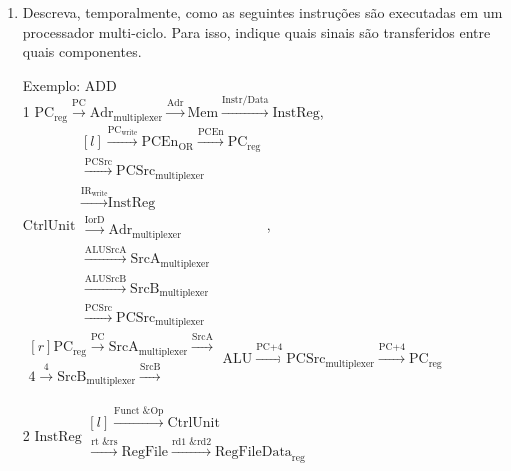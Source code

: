 \documentclass{article}
\begin{document}
\begin{enumerate}
\item Descreva, temporalmente, como as seguintes instruções são executadas em um processador multi-ciclo. Para isso, indique quais sinais são transferidos entre quais componentes.

Exemplo: ADD\\

1 $\text{PC}_\text{reg} \xrightarrow{\text{PC}} \text{Adr}_\text{multiplexer} \xrightarrow{\text{Adr}} \text{Mem} \xrightarrow{\text{Instr/Data}} \text{InstReg}$, $\text{CtrlUnit} \begin{matrix*}[l] 
\xrightarrow{\text{PC}_\text{write}} \text{PCEn}_\text{OR} \xrightarrow{\text{PCEn}} \text{PC}_\text{reg} \\ 
\xrightarrow{\text{PCSrc}} \text{PCSrc}_\text{multiplexer} \\
\xrightarrow{\text{IR}_\text{write}} \text{InstReg} \\
\xrightarrow{\text{IorD}} \text{Adr}_\text{multiplexer} \\ \xrightarrow{\text{ALUSrcA}} \text{SrcA}_\text{multiplexer} \\ \xrightarrow{\text{ALUSrcB}} \text{SrcB}_\text{multiplexer} \\ \xrightarrow{\text{PCSrc}} \text{PCSrc}_\text{multiplexer} \end{matrix*}$,\\ $\begin{matrix*}[r] \text{PC}_\text{reg} \xrightarrow{\text{PC}} \text{SrcA}_\text{multiplexer} \xrightarrow{\text{SrcA}} \\ \text{4} \xrightarrow{\text{4}} \text{SrcB}_\text{multiplexer} \xrightarrow{\text{SrcB}}\end{matrix*} \text{ALU} \xrightarrow{\text{PC+4}} \text{PCSrc}_\text{multiplexer} \xrightarrow{\text{PC+4}} \text{PC}_\text{reg}$\\

\bigbreak

2 $\text{InstReg} \begin{matrix*}[l] 
\xrightarrow{\text{Funct \& Op}} \text{CtrlUnit} \\ \xrightarrow{\text{rt \& rs}} \text{RegFile} \xrightarrow{\text{rd1 \& rd2}} \text{RegFileData}_\text{reg} \\ \end{matrix*}$\\

\bigbreak


\end{enumerate}
\end{document}
